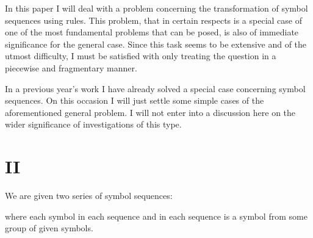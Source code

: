 In this paper I will deal with a problem concerning the transformation
of symbol sequences using rules.  This problem, that in certain respects is a
special case of one of the most fundamental problems that can be
posed, is also of immediate significance for the general case.
Since this task seems to be extensive and of the utmost difficulty,
I must be satisfied with only treating the question in a piecewise and
fragmentary manner.

In a previous year's work I have already solved a special case
concerning symbol sequences.  On this occasion I will just settle some
simple cases of the aforementioned general problem.  I will not enter
into a discussion here on the wider significance of investigations of
this type.

\section{II}


We are given two series of symbol sequences:

where each symbol in each sequence  and in each sequence  is a
symbol from some group of given symbols.


\vfill

